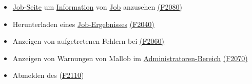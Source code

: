 \begin{itemize}[noitemsep]
            \item \hyperref[pages:job-page]{Job-Seite} um \hyperref[B:Job-Informationen]{Information} von \hyperref[B:Jobs]{Job} anzusehen \hyperref[FA:Web-Interface:Einsehen von Job-Informationen]{(F2080)}
            \item Herunterladen eines \hyperref[B:Job-Ergebnis]{Job-Ergebnisses} \hyperref[FA:Web-Interface:Herunterladen eines einzelnen Ergebnisses]{(F2040)}
            \item Anzeigen von aufgetretenen Fehlern bei  \hyperref[FA:Web-Interface:Anzeigen von Fehlern]{(F2060)}
            \item Anzeigen von Warnungen von \gls{Mallob} im \hyperref[pages:admin]{Administratoren-Bereich} \hyperref[FA:Web-Interface:Anzeigen von Warnungen und Fehlermeldungen]{(F2070)} 
            \item Abmelden des  (\hyperref[FA:Web-Interface:Abmelden]{F2110})
                      
        \end{itemize}
